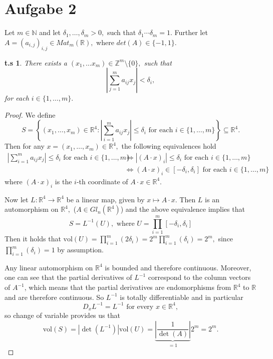 \documentclass[10pt,a4paper]{article}
\newtheorem*{zz*}{t.s}
\newcommand{\RR}{\mathbb{R}}
\newcommand{\ZZ}{\mathbb{Z}}
\begin{document}
	\section*{Aufgabe 2}
	Let $m\in \mathbb{N}$ and let $\delta_1,\dots, \delta_m> 0,$ such that $\delta_1 \cdots \delta_m = 1.$ Further let $A = (a_{i,j})_{i,j}\in Mat_{m}(\RR),$ where $det(A)\in \{-1,1\}.$
	\begin{zz*}
		There exists a $(x_1,\dots x_m)\in \ZZ^m\setminus\{0\},$ such that
		\[\left|\sum_{j=1}^ma_{ij}x_j\right|< \delta_i,\]
		for each $i\in \{1, \dots, m\}.$
	\end{zz*}
	\begin{proof}
		We define
		\[S = \left\{(x_1, \dots, x_m)\in \RR^4: \left|\sum_{i=1}^{m}a_{ij}x_j\right| \leq \delta_i \text{ for each } i\in \{1,\dots, m\}\right\}\subseteq \RR^4.\]
		Then for any $x = (x_1,\dots, x_m)\in \RR^4,$ the following equivalences hold
		\begin{align*}
			\left|\sum_{i=1}^{m}a_{ij}x_j\right| \leq \delta_i \text{ for each } i\in \{1,\dots, m\} &\Leftrightarrow \left| (A\cdot x)_i\right| \leq \delta_i \text{ for each } i\in \{1,\dots, m\}\\
			&\Leftrightarrow (A\cdot x)_i \in [-\delta_i, \delta_i] \text{ for each } i\in \{1,\dots, m\}
		\end{align*}
		where $(A\cdot x)_i$ is the $i$-th coordinate of $A\cdot x\in \RR^4.$
		
		Now let $L: \RR^4\to \RR^4$ be a linear map, given by $x\mapsto A\cdot x.$ Then $L$ is an automorphism on $\RR^4,$ ($A\in Gl_n(\RR^4)$) and the above equivalence implies that
		\[S = L^{-1}\left(U\right), \text{ where } U = \prod_{i=1}^{m}[-\delta_i, \delta_i]\]
		Then it holds that $\mathrm{vol}(U) = \prod_{i=1}^{m}(2\delta_i) = 2^m\prod_{i=1}^{m}(\delta_i) =2^m,$ since $\prod_{i=1}^{m}(\delta_i) = 1$ by assumption.
		
		Any linear automorphism on $\RR^4$ is bounded and therefore continuous. Moreover, one can see that the partial derivatives of $L^{-1}$ correspond to the column vectors of $A^{-1}$, which means that the partial derivatives are endomorphisms from $\RR^4$ to $\RR$ and are therefore continuous. So $L^{-1}$ is totally differentiable and in particular
		\begin{equation*}
			D_x L^{-1} = L^{-1} \text{ for every } x\in \RR^4,
		\end{equation*}
		so change of variable provides us that
		\begin{equation}
			\mathrm{vol}(S) = |\det(L^{-1})|\mathrm{vol}(U) = \underbrace{\left|\frac{1}{\det(A)}\right|}_{=1}2^m = 2^m.
			\label{eq:not:korr1}
		\end{equation}
		

\end{proof}
\end{document}
